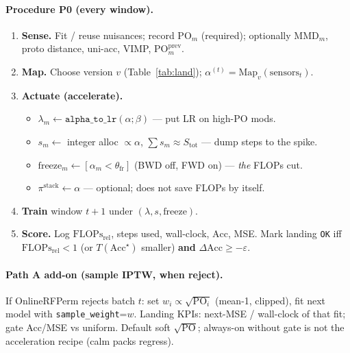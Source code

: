\documentclass[11pt]{article}
\newcommand{\PO}{\mathrm{PO}}
\newcommand{\MMD}{\mathrm{MMD}}
\newcommand{\Acc}{\mathrm{Acc}}
\newcommand{\Flops}{\mathrm{FLOPs}_{\mathrm{rel}}}
\begin{document}
\paragraph{Procedure P0 (every window).}
\begin{enumerate}[leftmargin=1.4em,itemsep=2pt]
  \item \textbf{Sense.} Fit / reuse nuisances; record
        $\PO_m$ (required); optionally $\MMD_m$, proto distance,
        uni-acc, VIMP, $\PO_m^{\mathrm{prev}}$.
  \item \textbf{Map.} Choose version $v$ (Table~\ref{tab:land});
        $\alpha^{(t)}=\mathrm{Map}_v(\mathrm{sensors}_t)$.
  \item \textbf{Actuate (accelerate).}
        \begin{itemize}[leftmargin=1em,itemsep=1pt]
          \item $\lambda_m\leftarrow\texttt{alpha\_to\_lr}(\alpha;\beta)$
                --- put LR on high-$\PO$ mods.
          \item $s_m\leftarrow$ integer alloc $\propto\alpha$,
                $\sum s_m\approx S_{\mathrm{tot}}$ --- dump steps
                to the spike.
          \item $\mathrm{freeze}_m\leftarrow[\alpha_m<\theta_{\mathrm{fr}}]$
                (BWD off, FWD on) --- \emph{the} FLOPs cut.
          \item $\pi^{\mathrm{stack}}\leftarrow\alpha$ --- optional;
                does not save FLOPs by itself.
        \end{itemize}
  \item \textbf{Train} window $t{+}1$ under $(\lambda,s,\mathrm{freeze})$.
  \item \textbf{Score.} Log $\Flops$, steps used, wall-clock,
        $\Acc$, MSE. Mark landing \texttt{OK} iff
        $\Flops < 1$ (or $T(\Acc^\star)$ smaller) \textbf{and}
        $\Delta\Acc\ge-\varepsilon$.
\end{enumerate}

\paragraph{Path A add-on (sample IPTW, when reject).}
If OnlineRFPerm rejects batch $t$: set
$w_i\propto\sqrt{\PO_i}$ (mean-1, clipped), fit next model with
\texttt{sample\_weight}=$w$.
Landing KPIs: next-MSE / wall-clock of that fit; gate Acc/MSE vs
uniform. Default soft $\sqrt{\PO}$; always-on without gate is not
the acceleration recipe (calm packs regress).
\end{document}
